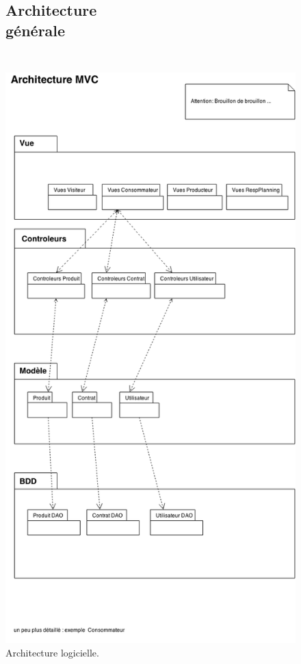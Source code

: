 \documentclass[12pt]{report}
\begin{document}
\begin{figure}[!hp]
\centering
\subsection{Architecture générale~~~~~~~~~~~~~~~~~~~~~~~~~~~~~~~}
\includegraphics[height=1.1\textwidth]{./ressources/architecture.png}
\caption{Architecture logicielle.}
\end{figure}
\clearpage
\end{document}
